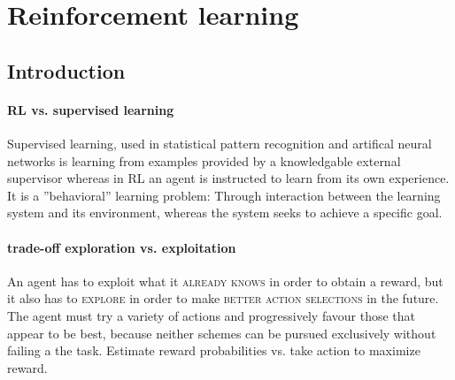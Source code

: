 \documentclass[11pt]{article}
\begin{document}
\section{Reinforcement learning}

\subsection{Introduction}
\paragraph{RL vs. supervised learning}
Supervised learning, used in statistical pattern recognition and artifical neural networks is learning from examples provided by a knowledgable external supervisor whereas in RL an agent is instructed to learn from its own experience. It is a ''behavioral'' learning problem: Through interaction between the learning system and its environment, whereas the system seeks to achieve a specific goal.

\paragraph{trade-off exploration vs. exploitation}
An agent has to exploit what it \textsc{already knows} in order to obtain a reward, but it also has to \textsc{explore} in order to make \textsc{better action selections} in the future. The agent must try a variety of actions and progressively favour those that appear to be best, because neither schemes can be pursued exclusively without failing a the task. Estimate reward probabilities vs. take action to maximize reward.
\end{document}
